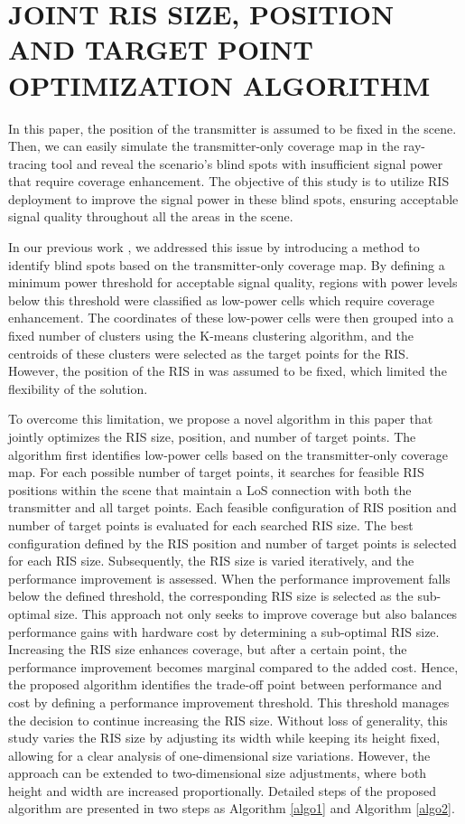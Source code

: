 \documentclass{IEEEoj}
\begin{document}
\section{JOINT RIS SIZE, POSITION AND TARGET POINT OPTIMIZATION ALGORITHM} \label{algo_section}
In this paper, the position of the transmitter is assumed to be fixed in the scene. Then, we can easily simulate the transmitter-only coverage map in the ray-tracing tool and reveal the scenario's blind spots with insufficient signal power that require coverage enhancement. The objective of this study is to utilize RIS deployment to improve the signal power in these blind spots, ensuring acceptable signal quality throughout all the areas in the scene.

In our previous work \cite{emre_claude_eucap_paper}, we addressed this issue by introducing a method to identify blind spots based on the transmitter-only coverage map. By defining a minimum power threshold for acceptable signal quality, regions with power levels below this threshold were classified as low-power cells which require coverage enhancement. The coordinates of these low-power cells were then grouped into a fixed number of clusters using the K-means clustering algorithm, and the centroids of these clusters were selected as the target points for the RIS. However, the position of the RIS in \cite{emre_claude_eucap_paper} was assumed to be fixed, which limited the flexibility of the solution.

To overcome this limitation, we propose a novel algorithm in this paper that jointly optimizes the RIS size, position, and number of target points. The algorithm first identifies low-power cells based on the transmitter-only coverage map. For each possible number of target points, it searches for feasible RIS positions within the scene that maintain a LoS connection with both the transmitter and all target points. Each feasible configuration of RIS position and number of target points is evaluated for each searched RIS size. The best configuration defined by the RIS position and number of target points is selected for each RIS size. Subsequently, the RIS size is varied iteratively, and the performance improvement is assessed. When the performance improvement falls below the defined threshold, the corresponding RIS size is selected as the sub-optimal size. This approach not only seeks to improve coverage but also balances performance gains with hardware cost by determining a sub-optimal RIS size. Increasing the RIS size enhances coverage, but after a certain point, the performance improvement becomes marginal compared to the added cost. Hence, the proposed algorithm identifies the trade-off point between performance and cost by defining a performance improvement threshold. This threshold manages the decision to continue increasing the RIS size. Without loss of generality, this study varies the RIS size by adjusting its width while keeping its height fixed, allowing for a clear analysis of one-dimensional size variations. However, the approach can be extended to two-dimensional size adjustments, where both height and width are increased proportionally. Detailed steps of the proposed algorithm are presented in two steps as Algorithm \ref{algo1} and Algorithm \ref{algo2}.
\end{document}
